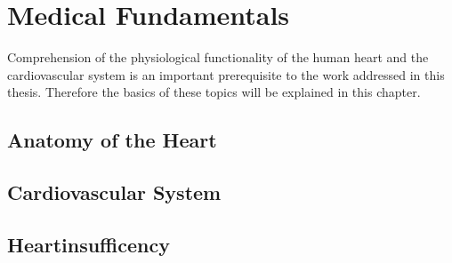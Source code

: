 \chapter{Medical Fundamentals}
Comprehension of the physiological functionality of the human heart and the cardiovascular system is an important prerequisite to the work addressed in this thesis. Therefore the basics of these topics will be explained in this chapter. 

\section{Anatomy of the Heart}

\section{Cardiovascular System}

\section{Heartinsufficency}
